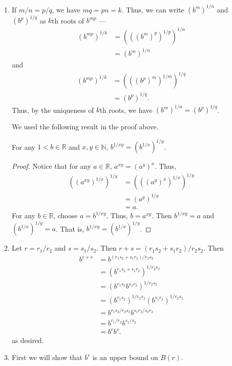\documentclass[12 pt, letterpaper]{hmcpset}
\begin{document}
\begin{solution}
	\begin{enumerate}
		\item If $m/n = p/q$, we have $mq = pn = k$. Thus, we can write $(b^{m})^{1/n}$ and $(b^{p})^{1/q}$ as $k$th roots of $b^{mp}$ ---
			\[
				\begin{split}
					(b^{mp})^{1/k} & = (((b^{m})^{p})^{1/p})^{1/n} \\
						       & = (b^{m})^{1/n}
				\end{split}
			\]
			and
			\[
				\begin{split}
					(b^{mp})^{1/k} & = (((b^{p})^{m})^{1/m})^{1/q} \\
						       & = (b^{p})^{1/q}.
				\end{split}
			\]
			Thus, by the uniqueness of $k$th roots, we have $(b^{m})^{1/n} = (b^{p})^{1/q}$.

			We used the following result in the proof above.

			\begin{lemma}
				For any $1 < b \in \mathbb{R}$ and $x, y \in \mathbb{N}$, $b^{1/xy} = (b^{1/x})^{1/y}$.
			\end{lemma}

			\begin{proof}
				Notice that for any $a \in \mathbb{R}$, $a^{xy} = (a^{y})^{x}$. Thus,
				\[
					\begin{split}
						((a^{xy})^{1/x})^{1/y} & = (((a^{y})^{x})^{1/x})^{1/y} \\
								       & = (a^{y})^{1/y} \\
								       & = a.
					\end{split}
				\]
				For any $b \in \mathbb{R}$, choose $a = b^{1/xy}$. Thus, $b = a^{xy}$. Then $b^{1/xy} = a$ and $(b^{1/x})^{1/y} = a$. That is, $b^{1/xy} = (b^{1/x})^{1/y}$.
			\end{proof}
		\item Let $r = r_{1}/r_{2}$ and $s = s_{1}/s_{2}$. Then $r + s = (r_{1} s_{2} + s_{1} r_{2})/r_{2} s_{2}$. Then
			\[
				\begin{split}
					b^{r + s} & = b^{(r_{1} s_{2} + s_{1} r_{2})/r_{2} s_{2}} \\
						  & = (b^{r_{1} s_{2} + s_{1} r_{2}})^{1/r_{2} s_{2}} \\
						  & = (b^{r_{1} s_{2}} b^{s_{1} r_{2}})^{1/r_{2} s_{2}} \\
						  & = (b^{r_{1} s_{2}})^{1/r_{2} s_{2}} (b^{s_{1} r_{2}})^{1/r_{2} s_{2}} \\
						  & = b^{r_{1} s_{2}/r_{2} s_{2}} b^{s_{1} r_{2}/s_{2} r_{2}} \\
						  & = b^{r_{1}/r_{2}} b^{s_{1}/s_{2}} \\
						  & = b^{r} b^{s}.
				\end{split}
			\]
			as desired.
		\item First we will show that $b^{r}$ is an upper bound on $B(r)$.


\end{enumerate}
\end{solution}
\end{document}
